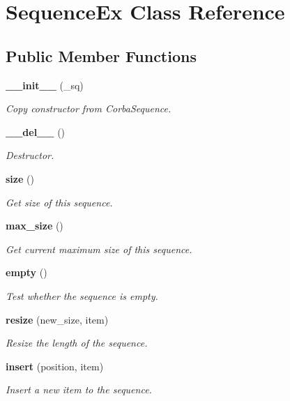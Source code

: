 \section{Sequence\-Ex Class Reference}
\label{classSequenceEx}
\subsection*{Public Member Functions}
\begin{CompactItemize}
\item 
{\bf \_\-\_\-init\_\-\_\-} (\_\-sq)
\begin{CompactList}\small\item\em Copy constructor from Corba\-Sequence. \item\end{CompactList}\item 
{\bf \_\-\_\-del\_\-\_\-} ()
\begin{CompactList}\small\item\em Destructor. \item\end{CompactList}\item 
{\bf size} ()
\begin{CompactList}\small\item\em Get size of this sequence. \item\end{CompactList}\item 
{\bf max\_\-size} ()
\begin{CompactList}\small\item\em Get current maximum size of this sequence. \item\end{CompactList}\item 
{\bf empty} ()
\begin{CompactList}\small\item\em Test whether the sequence is empty. \item\end{CompactList}\item 
{\bf resize} (new\_\-size, item)
\begin{CompactList}\small\item\em Resize the length of the sequence. \item\end{CompactList}\item 
{\bf insert} (position, item)
\begin{CompactList}\small\item\em Insert a new item to the sequence. \item\end{CompactList}\item 

\end{CompactItemize}
